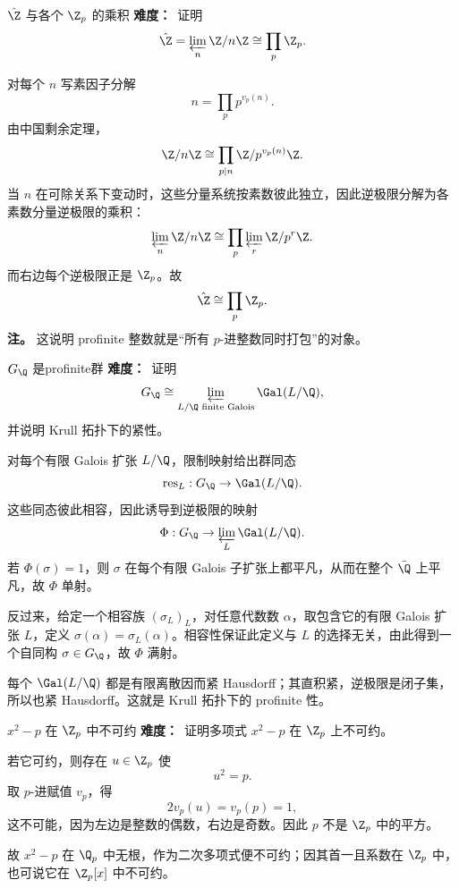 \begin{problem}{$\hat\Z$ 与各个 $\Z_p$ 的乘积}
\textbf{难度：}\medium\ 证明
\[
\hat\Z=\varprojlim_n \Z/n\Z\cong \prod_p \Z_p.
\]
\end{problem}
\begin{solution}
对每个 $n$ 写素因子分解
\[
n=\prod_p p^{v_p(n)}.
\]
由中国剩余定理，
\[
\Z/n\Z\cong \prod_{p\mid n}\Z/p^{v_p(n)}\Z.
\]
当 $n$ 在可除关系下变动时，这些分量系统按素数彼此独立，因此逆极限分解为各素数分量逆极限的乘积：
\[
\varprojlim_n \Z/n\Z\cong \prod_p \varprojlim_r \Z/p^r\Z.
\]
而右边每个逆极限正是 $\Z_p$。故
\[
\hat\Z\cong \prod_p\Z_p.
\]
\textbf{注。} 这说明 profinite 整数就是“所有 $p$-进整数同时打包”的对象。
\end{solution}

\begin{problem}{$G_\Q$ 是profinite群}
\textbf{难度：}\hard\ 证明
\[
G_\Q\cong \varprojlim_{L/\Q\text{ finite Galois}} \Gal(L/\Q),
\]
并说明 Krull 拓扑下的紧性。
\end{problem}
\begin{solution}
对每个有限 Galois 扩张 $L/\Q$，限制映射给出群同态
\[
\mathrm{res}_L:G_\Q\to \Gal(L/\Q).
\]
这些同态彼此相容，因此诱导到逆极限的映射
\[
\Phi:G_\Q\to \varprojlim_L \Gal(L/\Q).
\]
若 $\Phi(\sigma)=1$，则 $\sigma$ 在每个有限 Galois 子扩张上都平凡，从而在整个 $\bar\Q$ 上平凡，故 $\Phi$ 单射。

反过来，给定一个相容族 $(\sigma_L)_L$，对任意代数数 $\alpha$，取包含它的有限 Galois 扩张 $L$，定义 $\sigma(\alpha)=\sigma_L(\alpha)$。相容性保证此定义与 $L$ 的选择无关，由此得到一个自同构 $\sigma\in G_\Q$，故 $\Phi$ 满射。

每个 $\Gal(L/\Q)$ 都是有限离散因而紧 Hausdorff；其直积紧，逆极限是闭子集，所以也紧 Hausdorff。这就是 Krull 拓扑下的 profinite 性。
\end{solution}

\begin{problem}{$x^2-p$ 在 $\Z_p$ 中不可约}
\textbf{难度：}\hard\ 证明多项式 $x^2-p$ 在 $\Z_p$ 上不可约。
\end{problem}
\begin{solution}
若它可约，则存在 $u\in\Z_p$ 使
\[
u^2=p.
\]
取 $p$-进赋值 $v_p$，得
\[
2v_p(u)=v_p(p)=1,
\]
这不可能，因为左边是整数的偶数，右边是奇数。因此 $p$ 不是 $\Z_p$ 中的平方。

故 $x^2-p$ 在 $\Q_p$ 中无根，作为二次多项式便不可约；因其首一且系数在 $\Z_p$ 中，也可说它在 $\Z_p[x]$ 中不可约。
\end{solution}

